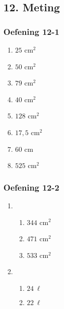 {\begin{multicols}{3}
\begin{enumerate}[noitemsep, label=\textbf{\arabic*}.]
\end{enumerate}
\end{multicols}

\subsection*{12. Meting}
\begin{multicols}{3}
\subsubsection*{Oefening 12-1} %
\begin{enumerate}[noitemsep, label=\textbf{\arabic*}. ] 
\item $25$ cm$^2$
\item $50$ cm$^2$
\item $79$ cm$^2$
\item $40$ cm$^2$
\item $128$ cm$^2$
\item $17,5$ cm$^2$
\item $60$ cm
\item $525$ cm$^2$
\end{enumerate}


\subsubsection*{Oefening 12-2} %
\begin{enumerate}[noitemsep, label=\textbf{\arabic*}. ] 
\item %
    \begin{enumerate}[noitemsep, label=\textbf{(\alph*)} ]
	  \item $344$ cm$^2$
	  \item  $471$ cm$^2$
	  \item  $533$ cm$^2$
    \end{enumerate}


\item %
    \begin{enumerate}[noitemsep, label=\textbf{(\alph*)} ]
	  \item $24~\ell$ %
	  \item $22~\ell$%
    \end{enumerate}
\end{enumerate}       



\end{multicols}}
